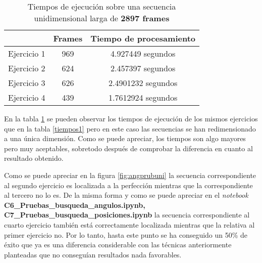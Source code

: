 \begin{table}[H]
\centering
\begin{tabular}{lcc}
\hline
\rowcolor[HTML]{EFEFEF} 
\multicolumn{1}{c}{\cellcolor[HTML]{EFEFEF}\textbf{Ejercicio}} & \multicolumn{1}{l}{\cellcolor[HTML]{EFEFEF}\textbf{Frames}} & \multicolumn{1}{l}{\cellcolor[HTML]{EFEFEF}\textbf{Tiempo de procesamiento}} \\ \hline
\rowcolor[HTML]{ECF4FF} 
Ejercicio 1                                                    & 969                                                         & 4.927449 segundos                                                            \\
\rowcolor[HTML]{EFEFEF} 
Ejercicio 2                                                    & 624                                                         & 2.457397 segundos                                                            \\
\rowcolor[HTML]{ECF4FF} 
Ejercicio 3                                                    & 626                                                         & 2.4901232 segundos                                                           \\
\rowcolor[HTML]{EFEFEF} 
Ejercicio 4                                                    & 439                                                         & 1.7612924 segundos                                                           \\ \hline
\end{tabular}
\caption{Tiempos de ejecución sobre una secuencia unidimensional larga de \textbf{2897 frames}}
\label{tiempos2}
\end{table}


En la tabla \ref{tiempos2} se pueden observar los tiempos de ejecución de los mismos ejercicios que en la tabla \ref{tiempos1} pero en este caso las secuencias se han redimensionado a una única dimensión. Como se puede apreciar, los tiempos son algo mayores pero muy aceptables, sobretodo después de comprobar la diferencia en cuanto al resultado obtenido.

Como se puede apreciar en la figura \ref{fig:angprubuni} la secuencia correspondiente al segundo ejercicio es localizada a la perfección mientras que la correspondiente al tercero no lo es. De la misma forma y como se puede apreciar en el \textit{notebook} \textbf{C6\_Pruebas\_busqueda\_angulos.ipynb, C7\_Pruebas\_busqueda\_posiciones.ipynb} la secuencia correspondiente al cuarto ejercicio también está correctamente localizada mientras que la relativa al primer ejercicio no. Por lo tanto, hasta este punto se ha conseguido un 50\% de éxito que ya es una diferencia considerable con las técnicas anteriormente planteadas que no conseguían resultados nada favorables.

